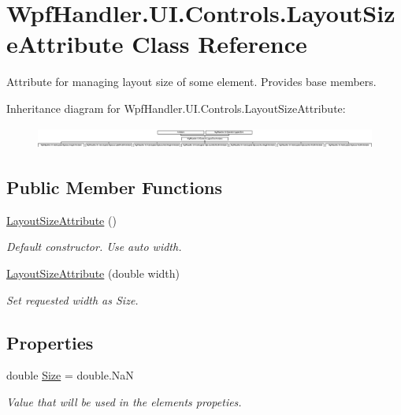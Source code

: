 \hypertarget{class_wpf_handler_1_1_u_i_1_1_controls_1_1_layout_size_attribute}{}\section{Wpf\+Handler.\+U\+I.\+Controls.\+Layout\+Size\+Attribute Class Reference}
\label{class_wpf_handler_1_1_u_i_1_1_controls_1_1_layout_size_attribute}


Attribute for managing layout size of some element. Provides base members.  


Inheritance diagram for Wpf\+Handler.\+U\+I.\+Controls.\+Layout\+Size\+Attribute\+:\begin{figure}[H]
\begin{center}
\leavevmode
\includegraphics[height=0.727273cm]{d7/d51/class_wpf_handler_1_1_u_i_1_1_controls_1_1_layout_size_attribute}
\end{center}
\end{figure}
\subsection*{Public Member Functions}
\begin{DoxyCompactItemize}
\item 
\mbox{\hyperlink{class_wpf_handler_1_1_u_i_1_1_controls_1_1_layout_size_attribute_ade163e9b2952d02cda556e26bf6be52f}{Layout\+Size\+Attribute}} ()
\begin{DoxyCompactList}\small\item\em Default constructor. Use auto width. \end{DoxyCompactList}\item 
\mbox{\hyperlink{class_wpf_handler_1_1_u_i_1_1_controls_1_1_layout_size_attribute_a35d91131ec3931e5bde8cf3b026ff23c}{Layout\+Size\+Attribute}} (double width)
\begin{DoxyCompactList}\small\item\em Set requested width as Size. \end{DoxyCompactList}\end{DoxyCompactItemize}
\subsection*{Properties}
\begin{DoxyCompactItemize}
\item 
double \mbox{\hyperlink{class_wpf_handler_1_1_u_i_1_1_controls_1_1_layout_size_attribute_a3cf68aa208cfd09f789773f844683f87}{Size}} = double.\+NaN
\begin{DoxyCompactList}\small\item\em Value that will be used in the element\textquotesingle{}s propeties. \end{DoxyCompactList}\end{DoxyCompactItemize}


